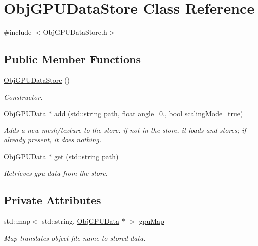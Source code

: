 \hypertarget{class_obj_g_p_u_data_store}{}\section{Obj\+G\+P\+U\+Data\+Store Class Reference}
\label{class_obj_g_p_u_data_store}


{\ttfamily \#include $<$Obj\+G\+P\+U\+Data\+Store.\+h$>$}

\subsection*{Public Member Functions}
\begin{DoxyCompactItemize}
\item 
\hyperlink{class_obj_g_p_u_data_store_a548c764aab1fe4fd622c924dd1c7eb89}{Obj\+G\+P\+U\+Data\+Store} ()\hypertarget{class_obj_g_p_u_data_store_a548c764aab1fe4fd622c924dd1c7eb89}{}\label{class_obj_g_p_u_data_store_a548c764aab1fe4fd622c924dd1c7eb89}

\begin{DoxyCompactList}\small\item\em Constructor. \end{DoxyCompactList}\item 
\hyperlink{class_obj_g_p_u_data}{Obj\+G\+P\+U\+Data} $\ast$ \hyperlink{class_obj_g_p_u_data_store_aa92191fb7db9147b05e89c983bf294db}{add} (std\+::string path, float angle=0., bool scaling\+Mode=true)
\begin{DoxyCompactList}\small\item\em Adds a new mesh/texture to the store\+: if not in the store, it loads and stores; if already present, it does nothing. \end{DoxyCompactList}\item 
\hyperlink{class_obj_g_p_u_data}{Obj\+G\+P\+U\+Data} $\ast$ \hyperlink{class_obj_g_p_u_data_store_a3b54d794f6aaa9cd1478934b018d47e9}{get} (std\+::string path)
\begin{DoxyCompactList}\small\item\em Retrieves gpu data from the store. \end{DoxyCompactList}\end{DoxyCompactItemize}
\subsection*{Private Attributes}
\begin{DoxyCompactItemize}
\item 
std\+::map$<$ std\+::string, \hyperlink{class_obj_g_p_u_data}{Obj\+G\+P\+U\+Data} $\ast$ $>$ \hyperlink{class_obj_g_p_u_data_store_a3872d9f1ae3877eafd8b068c3aba4694}{gpu\+Map}\hypertarget{class_obj_g_p_u_data_store_a3872d9f1ae3877eafd8b068c3aba4694}{}\label{class_obj_g_p_u_data_store_a3872d9f1ae3877eafd8b068c3aba4694}

\begin{DoxyCompactList}\small\item\em Map translates object file name to stored data. \end{DoxyCompactList}\end{DoxyCompactItemize}



